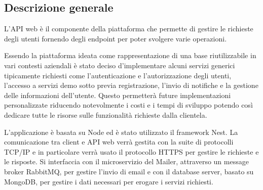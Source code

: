\subsection{Descrizione generale}
L'API web è il componente della piattaforma che permette di gestire le richieste degli utenti fornendo degli
endpoint per poter svolgere varie operazioni.

Essendo la piattaforma ideata come rappresentazione di una base riutilizzabile in vari contesti aziendali è stato deciso d'implementare alcuni servizi
generici tipicamente richiesti come l'autenticazione e l'autorizzazione degli utenti, l'accesso a servizi demo sotto previa registrazione, l'invio di notifiche e
la gestione delle informazioni dell'utente. Questo permetterà future implementazioni personalizzate riducendo notevolmente i costi e i tempi di sviluppo potendo così dedicare
tutte le risorse sulle funzionalità richieste dalla clientela.

L'applicazione è basata su Node ed è stato utilizzato il framework Nest.
La comunicazione tra client e API web verrà gestita con la suite di protocolli TCP/IP e in particolare verrà usato il protocollo HTTPS per gestire
le richieste e le risposte.
Si interfaccia con il microservizio del Mailer, attraverso un message broker RabbitMQ, per gestire l'invio di email e con il database server, basato su MongoDB, per gestire i dati necessari
per erogare i servizi richiesti.
